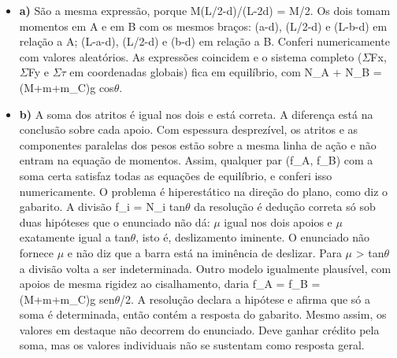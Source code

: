 \documentclass{article}%
\begin{document}
\begin{itemize}%
\item%
\textbf{a)} São a mesma expressão, porque M(L/2-d)/(L-2d) = M/2. Os dois tomam momentos em A e em B com os mesmos braços: (a-d), (L/2-d) e (L-b-d) em relação a A; (L-a-d), (L/2-d) e (b-d) em relação a B. Conferi numericamente com valores aleatórios. As expressões coincidem e o sistema completo ($\Sigma$Fx, $\Sigma$Fy e $\Sigma$$\tau$ em coordenadas globais) fica em equilíbrio, com N\_A + N\_B = (M+m+m\_C)g cos$\theta$.%
\item%
\textbf{b)} A soma dos atritos é igual nos dois e está correta. A diferença está na conclusão sobre cada apoio. Com espessura desprezível, os atritos e as componentes paralelas dos pesos estão sobre a mesma linha de ação e não entram na equação de momentos. Assim, qualquer par (f\_A, f\_B) com a soma certa satisfaz todas as equações de equilíbrio, e conferi isso numericamente. O problema é hiperestático na direção do plano, como diz o gabarito. A divisão f\_i = N\_i tan$\theta$ da resolução é dedução correta só sob duas hipóteses que o enunciado não dá: $\mu$ igual nos dois apoios e $\mu$ exatamente igual a tan$\theta$, isto é, deslizamento iminente. O enunciado não fornece $\mu$ e não diz que a barra está na iminência de deslizar. Para $\mu$ > tan$\theta$ a divisão volta a ser indeterminada. Outro modelo igualmente plausível, com apoios de mesma rigidez ao cisalhamento, daria f\_A = f\_B = (M+m+m\_C)g sen$\theta$/2. A resolução declara a hipótese e afirma que só a soma é determinada, então contém a resposta do gabarito. Mesmo assim, os valores em destaque não decorrem do enunciado. Deve ganhar crédito pela soma, mas os valores individuais não se sustentam como resposta geral.%
\end{itemize}%
\end{document}
